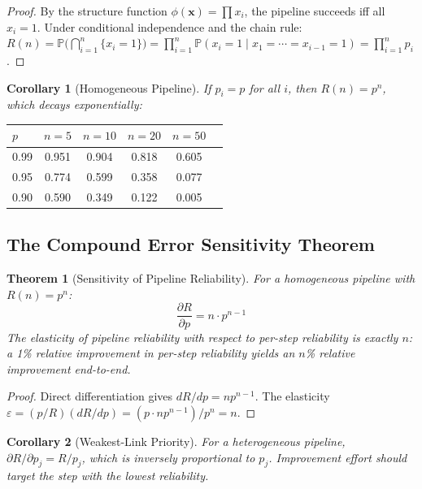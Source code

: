 \documentclass[11pt, a4paper, copyright]{googledeepmind}
\newtheorem{theorem}{Theorem}[section]
\newtheorem{corollary}{Corollary}[section]
\newcommand{\Prob}{\mathbb{P}}
\begin{document}
\begin{proof}
By the structure function $\phi(\mathbf{x}) = \prod x_i$, the pipeline succeeds iff all $x_i = 1$.
Under conditional independence and the chain rule:
$R(n) = \Prob\!\bigl(\bigcap_{i=1}^{n} \{x_i = 1\}\bigr) = \prod_{i=1}^{n} \Prob(x_i = 1 \mid x_1 = \cdots = x_{i-1} = 1) = \prod_{i=1}^{n} p_i$.
\end{proof}

\begin{corollary}[Homogeneous Pipeline]
If $p_i = p$ for all $i$, then $R(n) = p^n$, which decays exponentially:
\end{corollary}

\begin{center}
\begin{tabular}{lccccc}
\toprule
$p$ & $n{=}5$ & $n{=}10$ & $n{=}20$ & $n{=}50$ \\
\midrule
0.99 & 0.951 & 0.904 & 0.818 & 0.605 \\
0.95 & 0.774 & 0.599 & 0.358 & 0.077 \\
0.90 & 0.590 & 0.349 & 0.122 & 0.005 \\
\bottomrule
\end{tabular}
\end{center}

\subsection{The Compound Error Sensitivity Theorem}

\begin{theorem}[Sensitivity of Pipeline Reliability]
\label{thm:sensitivity}
For a homogeneous pipeline with $R(n) = p^n$:
\begin{equation}
\frac{\partial R}{\partial p} = n \cdot p^{n-1}
\end{equation}
The elasticity of pipeline reliability with respect to per-step reliability is exactly $n$: a 1\% relative improvement in per-step reliability yields an $n$\% relative improvement end-to-end.
\end{theorem}

\begin{proof}
Direct differentiation gives $dR/dp = np^{n-1}$.
The elasticity $\varepsilon = (p/R)(dR/dp) = (p \cdot n p^{n-1})/p^n = n$.
\end{proof}

\begin{corollary}[Weakest-Link Priority]
\label{cor:weakest}
For a heterogeneous pipeline, $\partial R / \partial p_j = R / p_j$, which is inversely proportional to $p_j$.
Improvement effort should target the step with the lowest reliability.
\end{corollary}
\end{document}
